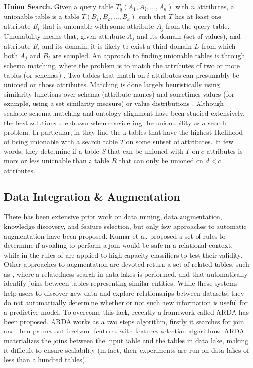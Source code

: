 \textbf{Union Search.} Given a query table $T_q(A_1,A_2,...,A_n)$ with $n$ attributes, a unionable table is a table $T(B_1, B_2,...,B_k)$ such that $T$ has at least one attribute $B_i$ that is unionable with some attribute $A_j$ from the query table. Unionability means that, given attribute $A_j$ and its domain (set of values), and attribute $B_i$ and its domain, it is likely to exist a third domain $D$ from which both $A_j$ and $B_i$ are sampled. An approach to finding unionable tables is through schema matching, where the problem is to match the attributes of two or more tables (or schemas) \cite{he2003statistical,rahm2011towards}. Two tables that match on $i$ attributes can presumably be unioned on those attributes. Matching is done largely heuristically using similarity functions over schema (attribute names) and sometimes values (for example, using a set similarity measure) or value distributions \cite{kang2003schema}. Although scalable schema matching and ontology alignment have been studied extensively, the best solutions are drawn when considering the unionability as a search problem. In particular, in \cite{nargesian2018table} they find the k tables that have the highest likelihood of being unionable with a search table $T$ on some subset of attributes. In few words, they determine if a table $S$ that can be unioned with $T$ on $c$ attributes is more or less unionable than a table $R$ that can only be unioned on $d < c$ attributes.


\subsection{Data Integration \& Augmentation}
There has been extensive prior work on data mining, data augmentation, knowledge discovery, and feature selection, but only few approaches to automatic augmentation have been proposed. Kumar et al. \cite{kumar2016join} proposed a set of rules to determine if avoiding to perform a join would be safe in a relational context, while in \cite{shah2017key} the rules of \cite{kumar2016join} are applied to high-capacity classifiers to test their validity. Other approaches to augmentation are devoted return a set of related tables, such as \cite{bogatu2020dataset}, where a relatedness search in data lakes is performed, and \cite{fernandez2018aurum} that automatically identify joins between tables representing similar entities. While these systems help users to discover new data and explore relationships between datasets, they do not automatically determine whether or not such new information
is useful for a predictive model. To overcome this lack, recently a framework called ARDA \cite{chepurko2020arda} has been proposed. ARDA works as a two steps algorithm, firstly it searches for join and then prunes out irrelvant features with features selection algorithms. ARDA materializes the joins between the input table and the tables in data lake, making it difficult to ensure scalability (in fact, their experiments are run on data lakes of less than a hundred tables).


